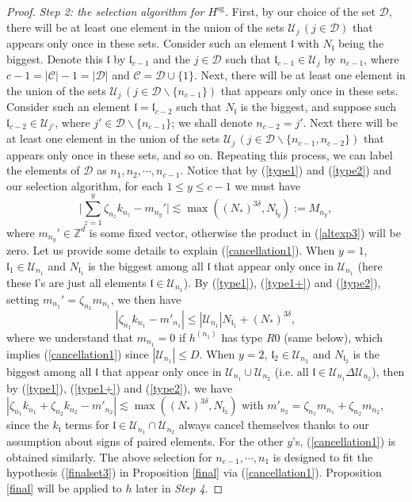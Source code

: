 \documentclass[11 pt,reqno]{amsart}
\theoremstyle{definition}
\theoremstyle{remark}
\numberwithin{equation}{section}
\newcommand{\Cc}{\mathcal{C}}
\newcommand{\Dc}{\mathcal{D}}
\newcommand{\Uc}{\mathcal{U}}
\newcommand{\Zb}{\mathbb{Z}}
\newcommand{\lf}{\mathfrak{l}}
\begin{document}
{\begin{proof}
\emph{Step 2: the selection algorithm for $H^{\mathrm{sg}}$.} First, by our choice of the set $\Dc$, there will be at least one element in the union of the sets $\Uc_j\,(j\in \Dc)$ that appears only once in these sets. Consider such an element $\lf$ with $N_\lf$ being the biggest. Denote this $\lf$ by $\lf_{c-1}$ and  the $j\in \Dc$ such that $\lf_{c-1}\in \Uc_j$ by $n_{c-1}$, where $c-1=|\Cc|-1=|\Dc|$ and $\Cc=\Dc\cup\{1\}$. Next, there will be at least one element in the union of the sets $\Uc_j\,(j\in \Dc\backslash\{n_{c-1}\})$ that appears only once in these sets. Consider such an element $\lf=\lf_{c-2}$ such that $N_\lf$ is the biggest, and suppose such $\lf_{c-2}\in \Uc_{j'}$, where $j'\in \Dc\backslash\{n_{c-1}\}$; we shall denote $n_{c-2}=j'$. Next there will be at least one element in the union of the sets $\Uc_j\,(j\in \Dc\backslash\{n_{c-1},n_{c-2}\})$ that appears only once in these sets, and so on. Repeating this process, we can label the elements of $\Dc$ as $n_1, n_2, \cdots, n_{c-1}$. Notice that by (\ref{type1}) and (\ref{type2}) and our selection algorithm, for each $1\leq y\leq c-1$ we must have 
  \begin{equation}\label{cancellation1}\bigg|\sum_{z=1}^y\zeta_{n_z}k_{n_z}-m_{n_y}'\bigg|\lesssim \max((N_*)^{3\delta}, N_{\lf_y}):=M_{n_y},
  \end{equation} where $m_{n_y}'\in\Zb^d$ is some fixed vector, otherwise the product in (\ref{altexp3}) will be zero. Let us provide some details to explain (\ref{cancellation1}). When $y=1$, $\lf_1\in \Uc_{n_1}$ and $N_{\lf_1}$ is the biggest among all $\lf$ that appear only once in $\Uc_{n_1}$ (here these $\lf$'s are just all elements $\lf\in \Uc_{n_1}$). By (\ref{type1}), (\ref{type1+}) and (\ref{type2}), setting $m_{n_1}'=\zeta_{n_1}m_{n_1}$, we then have\begin{equation}\label{cancellation1'}
  |\zeta_{n_1}k_{n_1} - m'_{n_1}| \leq |\Uc_{n_1}| N_{\lf_1} +(N_*)^{3\delta},
  \end{equation}
  where we understand that $m_{n_1}=0$ if $h^{(n_1)}$ has type $R0$ (same below), which implies (\ref{cancellation1}) since $|\Uc_{n_1}|\leq  D$.
  When $y=2$, $\lf_2\in \Uc_{n_2}$ and $N_{\lf_2}$ is the biggest among all $\lf$ that appear only once in $\Uc_{n_1}\cup \Uc_{n_2}$ (i.e. all $\lf\in\Uc_{n_1}\Delta \Uc_{n_2}$), then by
  (\ref{type1}), (\ref{type1+}) and (\ref{type2}), we have $|\zeta_{n_1}k_{n_1}+\zeta_{n_2}k_{n_2}-m'_{n_2}|\lesssim  \max((N_*)^{3\delta}, N_{\lf_2})$ with $m'_{n_2}=\zeta_{n_1} m_{n_1}+\zeta_{n_2} m_{n_2}$, since the $k_\lf$ terms for $\lf\in\Uc_{n_1}\cap \Uc_{n_2}$ always cancel themselves thanks to our assumption about signs of paired elements. For the other $y$'s, (\ref{cancellation1}) is obtained similarly. The above selection for $n_{c-1},\cdots, n_1$ is designed to fit the hypothesis (\ref{finalset3}) in Proposition \ref{final} via (\ref{cancellation1}).  Proposition \ref{final} will be applied to $h$ later in \emph{Step 4}.
  

\end{proof}}
\end{document}
